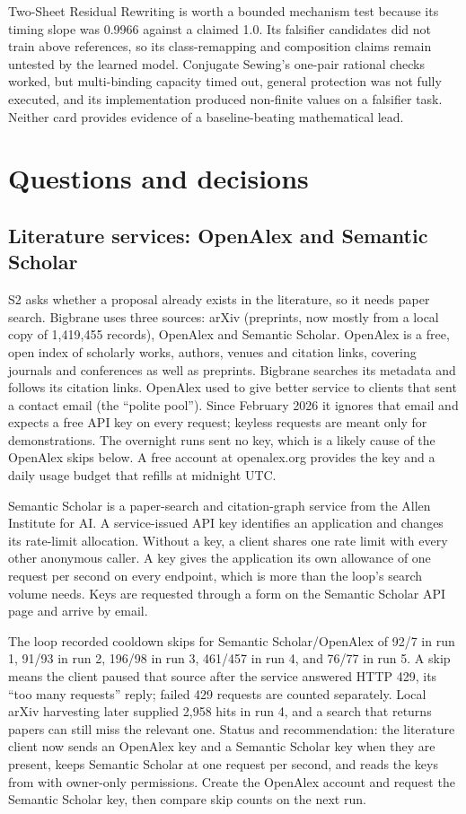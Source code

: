 Two-Sheet Residual Rewriting is worth a bounded mechanism test because its timing slope was 0.9966 against a claimed 1.0. Its falsifier candidates did not train above references, so its class-remapping and composition claims remain untested by the learned model. Conjugate Sewing's one-pair rational checks worked, but multi-binding capacity timed out, general protection was not fully executed, and its implementation produced non-finite values on a falsifier task. Neither card provides evidence of a baseline-beating mathematical lead.

\section{Questions and decisions}

\subsection{Literature services: OpenAlex and Semantic Scholar}

S2 asks whether a proposal already exists in the literature, so it needs paper search. Bigbrane uses three sources: arXiv (preprints, now mostly from a local copy of 1,419,455 records), OpenAlex and Semantic Scholar. OpenAlex is a free, open index of scholarly works, authors, venues and citation links, covering journals and conferences as well as preprints. Bigbrane searches its metadata and follows its citation links. OpenAlex used to give better service to clients that sent a contact email (the ``polite pool''). Since February 2026 it ignores that email and expects a free API key on every request; keyless requests are meant only for demonstrations. The overnight runs sent no key, which is a likely cause of the OpenAlex skips below. A free account at openalex.org provides the key and a daily usage budget that refills at midnight UTC.

Semantic Scholar is a paper-search and citation-graph service from the Allen Institute for AI. A service-issued API key identifies an application and changes its rate-limit allocation. Without a key, a client shares one rate limit with every other anonymous caller. A key gives the application its own allowance of one request per second on every endpoint, which is more than the loop's search volume needs. Keys are requested through a form on the Semantic Scholar API page and arrive by email.

The loop recorded cooldown skips for Semantic Scholar/OpenAlex of 92/7 in run 1, 91/93 in run 2, 196/98 in run 3, 461/457 in run 4, and 76/77 in run 5. A skip means the client paused that source after the service answered HTTP 429, its ``too many requests'' reply; failed 429 requests are counted separately. Local arXiv harvesting later supplied 2,958 hits in run 4, and a search that returns papers can still miss the relevant one. Status and recommendation: the literature client now sends an OpenAlex key and a Semantic Scholar key when they are present, keeps Semantic Scholar at one request per second, and reads the keys from  with owner-only permissions. Create the OpenAlex account and request the Semantic Scholar key, then compare skip counts on the next run.

